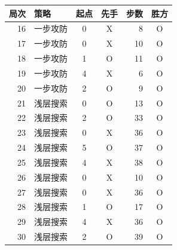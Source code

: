 \begin{tabular}{rlccrc}
\toprule
局次 & 策略 & 起点 & 先手 & 步数 & 胜方 \\
\midrule
16 & 一步攻防 & 0 & X & 8 & O \\
17 & 一步攻防 & 0 & X & 10 & O \\
18 & 一步攻防 & 1 & O & 11 & O \\
19 & 一步攻防 & 4 & X & 6 & O \\
20 & 一步攻防 & 2 & O & 9 & O \\
21 & 浅层搜索 & 0 & O & 13 & O \\
22 & 浅层搜索 & 2 & O & 33 & O \\
23 & 浅层搜索 & 0 & X & 36 & O \\
24 & 浅层搜索 & 5 & O & 37 & O \\
25 & 浅层搜索 & 4 & X & 38 & O \\
26 & 浅层搜索 & 0 & X & 10 & O \\
27 & 浅层搜索 & 0 & X & 36 & O \\
28 & 浅层搜索 & 1 & O & 17 & O \\
29 & 浅层搜索 & 4 & X & 36 & O \\
30 & 浅层搜索 & 2 & O & 39 & O \\
\bottomrule
\end{tabular}
